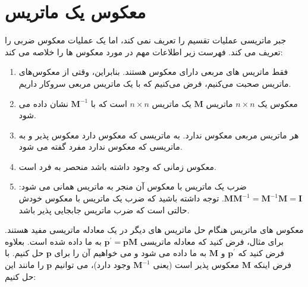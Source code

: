 \section{\textbf{معکوس یک ماتریس}}
\label{sec:2.7}
{
    \Large
    \begin{spacing}{1.5}
        جبر ماتریسی عملیات تقسیم را تعریف نمی کند، اما یک عملیات معکوس ضربی را تعریف می کند. فهرست زیر اطلاعات مهم در مورد معکوس ها را خلاصه می کند:

        \begin{enumerate}[label=\textbf{\arabic*}.]
            \item {فقط ماتریس های مربعی دارای معکوس هستند.
            بنابراین، وقتی از معکوس‌های ماتریس صحبت می‌کنیم، فرض می‌کنیم که با یک ماتریس مربعی سروکار داریم.}

            \item {معکوس یک $n\times n$ ماتریس $\textbf{M}$ یک ماتریس $n\times n$ است که با $\textbf{M}^{-1}$ نشان داده می شود.}

            \item {هر ماتریس مربعی معکوس ندارد.
            به ماتریسی که معکوس دارد معکوس پذیر و به ماتریسی که معکوس ندارد مفرد گفته می شود.}

            \item {معکوس زمانی که وجود داشته باشد منحصر به فرد است.}

            \item {ضرب یک ماتریس با معکوس آن منجر به ماتریس همانی می شود: $\textbf{M}\textbf{M}^{-1}=\textbf{M}^{-1}\textbf{M}=\textbf{I}$.
            توجه داشته باشید که ضرب یک ماتریس با معکوس خودش حالتی است که ضرب ماتریس جابجایی پذیر باشد.}
        \end{enumerate}

        معکوس های ماتریس هنگام حل ماتریس های دیگر در یک معادله ماتریسی مفید هستند.
        برای مثال، فرض کنید که معادله ماتریسی $\textbf{p}^{\prime}=\textbf{p}\textbf{M}$ به ما داده شده است.
        بعلاوه فرض کنید که $\textbf{p}^{\prime}$ و $\textbf{M}$ به ما داده می شود و می خواهیم آن را برای $\textbf{p}$ حل کنیم.
        با فرض اینکه $\textbf{M}$ معکوس پذیر است (یعنی $\textbf{M}^{-1}$ وجود دارد)، می توانیم $\textbf{p}$ را مانند این حل کنیم:

        \begin{flushleft}
        \end{flushleft}


\end{spacing}}
